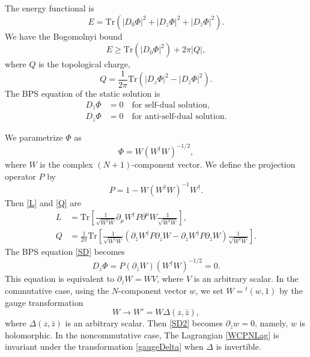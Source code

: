 \documentclass[a4paper,12pt]{article}
\begin{document}
The energy functional is
\begin{equation}
E=\mbox{Tr}(|D_0 \Phi|^2+|D_z \Phi|^2+|D_{\bar{z}} \Phi|^2).
\end{equation}
We have the Bogomolnyi bound
\begin{equation}
E\ge\mbox{Tr}(|D_0 \Phi|^2)+2\pi|Q|,
\end{equation}
where $Q$ is the topological charge,
\begin{equation}
Q=\frac{1}{2\pi}\mbox{Tr}(|D_z \Phi|^2-|D_{\bar{z}} \Phi|^2).\label{Q}
\end{equation}
The BPS equation of the static solution is
\begin{align}
D_{\bar{z}}\Phi&=0\quad \mbox{for self-dual solution},\label{SD}\\
D_z\Phi&=0\quad \mbox{for anti-self-dual solution}.
\end{align}

We parametrize $\Phi$ as
\begin{equation}
\Phi=W(W^\dag W)^{-1/2},
\end{equation}
where $W$ is the complex $(N+1)$-component vector. We define the projection operator $P$ by
\begin{equation}
P=1-W(W^\dag W)^{-1}W^\dag.
\end{equation}
Then \eqref{L} and \eqref{Q} are
\begin{align}
L&=\mbox{Tr}\left[\frac{1}{\sqrt{W^\dag W}}\partial_\mu W^\dag P\partial^\mu W\frac{1}{\sqrt{W^\dag W}}\right],
\label{WCPNLag}\\
Q&=\frac{1}{2\pi}\mbox{Tr}\left[\frac{1}{\sqrt{W^\dag W}}(\partial_{\bar{z}}W^\dag P\partial_z W-
\partial_z W^\dag P\partial_{\bar{z}}W)\frac{1}{\sqrt{W^\dag W}}\right].
\end{align}
The BPS equation \eqref{SD} becomes
\begin{equation}
D_{\bar{z}}\Phi=P(\partial_{\bar{z}}W)(W^\dag W)^{-1/2}=0.\label{SD2}
\end{equation}
This equation is equivalent to $\partial_{\bar{z}}W=WV$, where $V$ is an arbitrary scalar. 
In the commutative case, using the $N$-component vector $w$, we set
$W={}^{t}(w,1)$ by the gauge transformation 
\begin{equation}
W \to W'=W \Delta(z,\bar{z})\label{gaugeDelta},
\end{equation}
where $\Delta(z,\bar{z})$ is an arbitrary scalar.
Then \eqref{SD2} becomes $\partial_{\bar{z}}w=0$, namely, $w$ is holomorphic.
In the noncommutative case, The Lagrangian \eqref{WCPNLag} is invariant 
under the transformation \eqref{gaugeDelta} when $\Delta$ is invertible.
\end{document}
